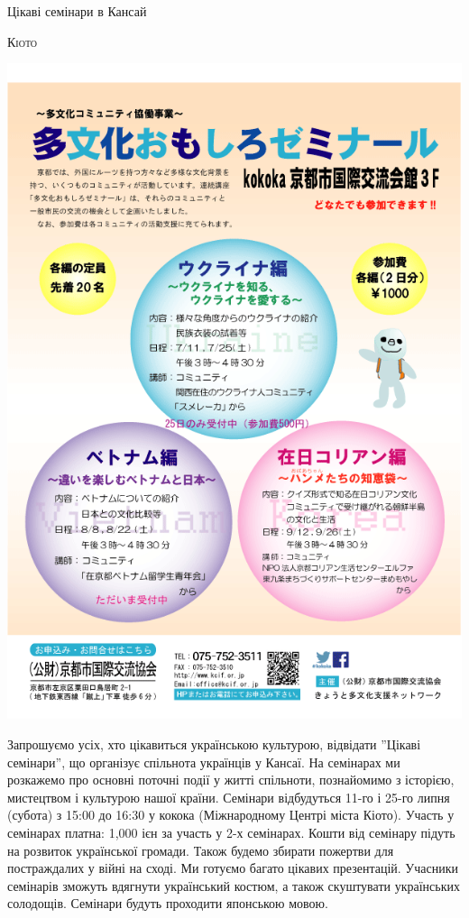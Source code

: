 \documentclass[10pt,a4paper]{article}
\newcommand{\NewsItem}[1]{%
		\usefont{T2A}{iwona}{m}{n} 
		\large #1 \vspace{4pt}
		\par \normalsize \normalfont}
\newcommand{\NewsAuthor}[1]{%
			\hfill \textsc{#1} \vspace{4pt}
			\par \normalfont}
\begin{document}
\begin{multicols}{3}
\vspace{1cm}
\NewsItem{Цікаві семінари в Кансай}
\NewsAuthor{Кіото}
		\begin{center}
			\includegraphics[width=0.8\linewidth]{images/seminary}
		\end{center}
Запрошуємо усіх, хто цікавиться українською культурою, відвідати ''Цікаві семінари'', що організує спільнота українців у Кансаї. На семінарах ми розкажемо про основні поточні події у житті спільноти, познайомимо з історією, мистецтвом і культурою нашої країни. Семінари відбудуться 11-го і 25-го липня (субота) з 15:00 до 16:30 у кокока (Міжнародному Центрі міста Кіото). Участь у семінарах платна: 1,000 ієн за участь у 2-х семінарах. Кошти від семінару підуть на розвиток української громади. Також будемо збирати пожертви для постраждалих у війні на сході. Ми готуємо багато цікавих презентацій. Учасники семінарів зможуть вдягнути український костюм, а також скуштувати українських солодощів. Семінари будуть проходити японською мовою. 
\end{multicols}
\end{document}
